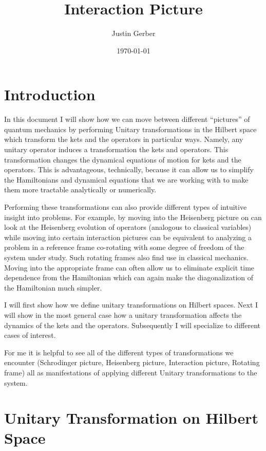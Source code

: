 \documentclass[12pt]{article}
\begin{document}
\title{Interaction Picture}
\author{Justin Gerber}
\date{\today}
\maketitle

\section{Introduction}

In this document I will show how we can move between different ``pictures'' of quantum mechanics by performing Unitary transformations in the Hilbert space which transform the kets and the operators in particular ways. Namely, any unitary operator induces a transformation the kets and operators. This transformation changes the dynamical equations of motion for kets and the operators. This is advantageous, technically, because it can allow us to simplify the Hamiltonians and dynamical equations that we are working with to make them more tractable analytically or numerically. 

Performing these transformations can also provide different types of intuitive insight into problems. For example, by moving into the Heisenberg picture on can look at the Heisenberg evolution of operators (analogous to classical variables) while moving into certain interaction pictures can be equivalent to analyzing a problem in a reference frame co-rotating with some degree of freedom of the system under study. Such rotating frames also find use in classical mechanics. Moving into the appropriate frame can often allow us to eliminate explicit time dependence from the Hamiltonian which can again make the diagonalization of the Hamiltonian much simpler.

I will first show how we define unitary transformations on Hilbert spaces. Next I will show in the most general case how a unitary transformation affects the dynamics of the kets and the operators. Subsequently I will specialize to different cases of interest.

For me it is helpful to see all of the different types of transformations we encounter (Schrodinger picture, Heisenberg picture, Interaction picture, Rotating frame) all as manifestations of applying different Unitary transformations to the system.


\section{Unitary Transformation on Hilbert Space}
\end{document}
